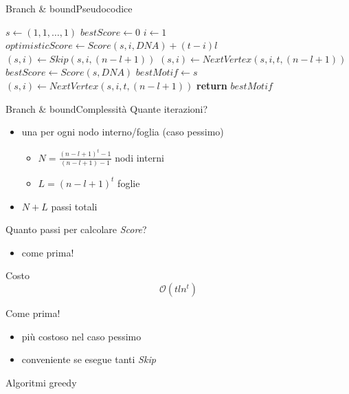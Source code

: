 	\begin{frame}{Branch \& bound}{Pseudocodice}
		\begin{center}\scriptsize
		    \begin{algorithmic}[1]
				    \State $s\gets (1,1,\dots,1)$
				    \State $bestScore\gets 0$
				    \State $i\gets 1$
							\State $optimisticScore\gets Score(s,i,DNA)+(t-i)l$
								\State $(s,i)\gets Skip(s,i,(n-l+1))$
							\Else
								\State $(s,i)\gets NextVertex(s,i,t,(n-l+1))$
							\EndIf
						\Else
								\State $bestScore\gets Score(s,DNA)$
								\State $bestMotif\gets s$
							\EndIf
							\State $(s,i)\gets NextVertex(s,i,t,(n-l+1))$
						\EndIf
				    \EndWhile
				    \State \textbf{return} $bestMotif$
			    \EndProcedure
		    \end{algorithmic}
	    \end{center}
	\end{frame}
	
	\begin{frame}{Branch \& bound}{Complessità}
		Quante iterazioni?
		\begin{itemize}
			\item una per ogni nodo interno/foglia (caso pessimo)
			\begin{itemize}
				\item $N=\frac{(n-l+1)^t-1}{(n-l+1)-1}$ nodi interni
				\item $L=(n-l+1)^t$ foglie
			\end{itemize}
			\item $N+L$ passi totali
		\end{itemize}
		Quanto passi per calcolare \textit{Score}?
		\begin{itemize}
			\item come prima!
		\end{itemize}
		\begin{block}{Costo}
			$$\mathcal{O}(tln^t)$$
		\end{block}
		Come prima!
		\begin{itemize}
			\item più costoso nel caso pessimo
			\item conveniente se esegue tanti \textit{Skip}
		\end{itemize}
	\end{frame}
	
	\begin{frame}{Algoritmi greedy}
	\end{frame}
	
